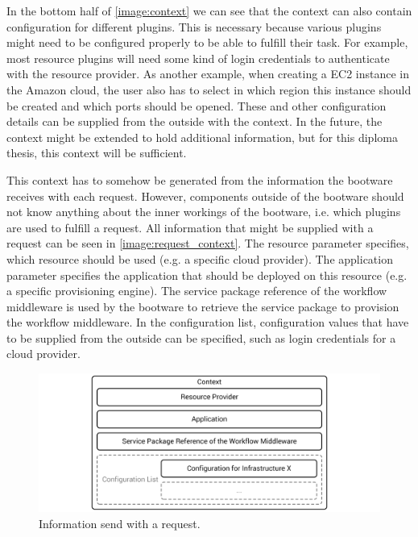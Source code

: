 In the bottom half of \autoref{image:context} we can see that the context can also contain configuration for different plugins.
This is necessary because various plugins might need to be configured properly to be able to fulfill their task.
For example, most resource plugins will need some kind of login credentials to authenticate with the resource provider.
As another example, when creating a EC2 instance in the Amazon cloud, the user also has to select in which region this instance should be created and which ports should be opened.
These and other configuration details can be supplied from the outside with the context.
In the future, the context might be extended to hold additional information, but for this diploma thesis, this context will be sufficient.

This context has to somehow be generated from the information the bootware receives with each request.
However, components outside of the bootware should not know anything about the inner workings of the bootware, i.e. which plugins are used to fulfill a request.
All information that might be supplied with a request can be seen in \autoref{image:request_context}.
The resource parameter specifies, which resource should be used (e.g. a specific cloud provider).
The application parameter specifies the application that should be deployed on this resource (e.g. a specific provisioning engine).
The service package reference of the workflow middleware is used by the bootware to retrieve the service package to provision the workflow middleware.
In the configuration list, configuration values that have to be supplied from the outside can be specified, such as login credentials for a cloud provider.

\begin{figure}[!htbp]
	\centering
	\includegraphics[resolution=600]{design/assets/request_context}
	\caption{Information send with a request.}
	\label{image:request_context}
\end{figure}

